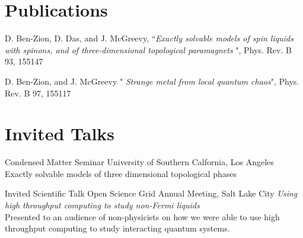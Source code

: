 \documentclass[]{friggeri-cv} %
\begin{document}
\section{Publications}

\begin{entrylist}


\minientry
{D. Ben-Zion, D. Das, and J. McGreevy, ``{\it Exactly solvable models of spin liquids with spinons,
 and of three-dimensional topological paramagnets }", Phys. Rev. B 93, 155147 }


\minientry
{D. Ben-Zion, and J. McGreevy "{\it 
Strange metal from local quantum chaos}", Phys. Rev. B 97, 155117 }



\end{entrylist}




\section{Invited Talks}

\begin{entrylist}


\talkentry
{Condensed Matter Seminar}
{University of Southern Calfornia, Los Angeles}
{Exactly solvable models of three dimensional topological phases }


\talkentry
{Invited Scientific Talk}
{Open Science Grid Annual Meeting, Salt Lake City}
{\emph{Using high throughput computing to study non-Fermi liquids }\\
Presented to an audience of non-physicists on how we were able to use high throughput computing to study interacting quantum systems. }


\end{entrylist}
\end{document}
